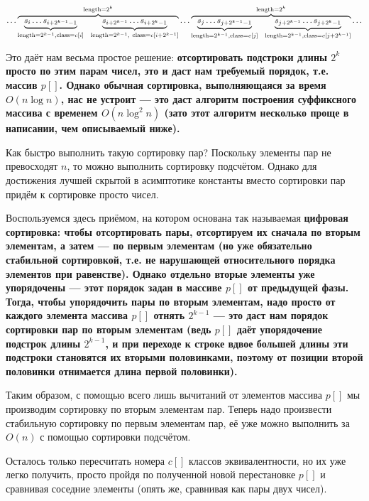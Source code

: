 $$ \ldots \overbrace{ \underbrace{ s_i \ldots s_{i+2^{k-1}-1} }_{{\rm length}=2^{k-1},{\rm class}=c[i]}\ \ \underbrace{ s_{i+2^{k-1}} \ldots s_{i+2^k-1} }_{{\rm length}=2^{k-1},\ {\rm class}=c[i+2^{k-1}]} }^{{\rm length}=2^k} \ldots \overbrace{ \underbrace{ s_j \ldots s_{j+2^{k-1}-1} }_{{\rm length}=2^{k-1},{\rm class}=c[j]}\ \ \underbrace{ s_{j+2^{k-1}} \ldots s_{j+2^k-1} }_{{\rm length}=2^{k-1},{\rm class}=c[j+2^{k-1}]} }^{{\rm length}=2^k} \ldots $$

Это даёт нам весьма простое решение: \bf{отсортировать} подстроки длины $2^k$ просто \bf{по} этим \bf{парам чисел}, это и даст нам требуемый порядок, т.е. массив $p[]$. Однако обычная сортировка, выполняющаяся за время $O(n \log n)$, нас не устроит --- это даст алгоритм построения суффиксного массива с временем $O(n \log^2 n)$ (зато этот алгоритм несколько проще в написании, чем описываемый ниже).

Как быстро выполнить такую сортировку пар? Поскольку элементы пар не превосходят $n$, то можно выполнить сортировку подсчётом. Однако для достижения лучшей скрытой в асимптотике константы вместо сортировки пар придём к сортировке просто чисел.

Воспользуемся здесь приёмом, на котором основана так называемая \bf{цифровая сортировка}: чтобы отсортировать пары, отсортируем их сначала по вторым элементам, а затем --- по первым элементам (но уже обязательно стабильной сортировкой, т.е. не нарушающей относительного порядка элементов при равенстве). Однако отдельно вторые элементы уже упорядочены --- этот порядок задан в массиве $p[]$ от предыдущей фазы. Тогда, чтобы упорядочить пары по вторым элементам, надо просто от каждого элемента массива $p[]$ отнять $2^{k-1}$ --- это даст нам порядок сортировки пар по вторым элементам (ведь $p[]$ даёт упорядочение подстрок длины $2^{k-1}$, и при переходе к строке вдвое большей длины эти подстроки становятся их вторыми половинками, поэтому от позиции второй половинки отнимается длина первой половинки).

Таким образом, с помощью всего лишь вычитаний от элементов массива $p[]$ мы производим сортировку по вторым элементам пар. Теперь надо произвести стабильную сортировку по первым элементам пар, её уже можно выполнить за $O(n)$ с помощью сортировки подсчётом.

Осталось только пересчитать номера $c[]$ классов эквивалентности, но их уже легко получить, просто пройдя по полученной новой перестановке $p[]$ и сравнивая соседние элементы (опять же, сравнивая как пары двух чисел).

